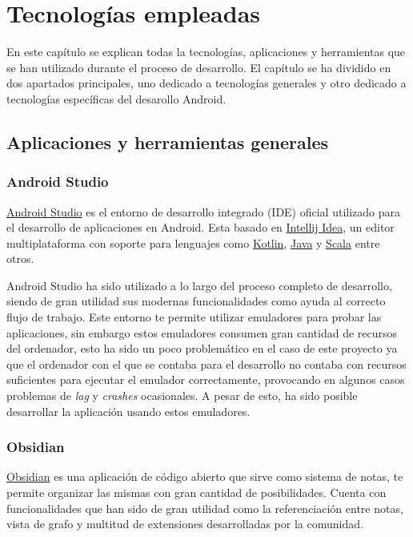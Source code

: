 \chapter{Tecnologías empleadas}
\label{cap:tecnologiasEmpleadas}
En este capítulo se explican todas la tecnologías, aplicaciones y herramientas que se han utilizado durante el proceso de desarrollo. El capítulo se ha dividido en dos apartados principales, uno dedicado a tecnologías generales y otro dedicado a tecnologías específicas del desarollo Android.

\section{Aplicaciones y herramientas generales}
\subsection{Android Studio}\hypertarget{subsec:android_studio}{}
\href{https://developer.android.com/studio/intro}{Android Studio} es el entorno de desarrollo integrado (IDE) oficial utilizado para el desarrollo de aplicaciones en Android. Esta basado en \href{https://www.jetbrains.com/idea}{Intellij Idea}, un editor multiplataforma con soporte para lenguajes como \hyperlink{subsec:kotlin}{Kotlin}, \href{https://www.java.com}{Java} y \href{https://www.scala-lang.org}{Scala} entre otros. 

Android Studio ha sido utilizado a lo largo del proceso completo de desarrollo, siendo de gran utilidad sus modernas funcionalidades como ayuda al correcto flujo de trabajo. Este entorno te permite utilizar emuladores para probar las aplicaciones, sin embargo estos emuladores consumen gran cantidad de recursos del ordenador, esto ha sido un poco problemático en el caso de este proyecto ya que el ordenador con el que se contaba para el desarrollo no contaba con recursos suficientes para ejecutar el emulador correctamente, provocando en algunos casos problemas de \textit{lag} y \textit{crashes} ocasionales. A pesar de esto, ha sido posible desarrollar la aplicación usando estos emuladores.

\subsection{Obsidian}
\href{https://obsidian.md/}{Obsidian} es una aplicación de código abierto que sirve como sistema de notas, te permite organizar las mismas con gran cantidad de posibilidades. Cuenta con funcionalidades que han sido de gran utilidad como la referenciación entre notas, vista de grafo y multitud de extensiones desarrolladas por la comunidad.

